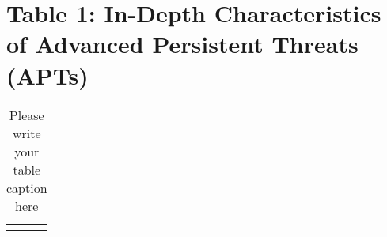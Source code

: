 \section{Table 1: In-Depth Characteristics of Advanced Persistent Threats (APTs)}
%
\begin{table}[!t]
\caption{Please write your table caption here}
\label{tab:1}       %
%
%
\begin{tabular}{p{2.4cm}p{2.4cm}p{4.9cm}}
\hline\noalign{\smallskip}
\noalign{\smallskip}\svhline\noalign{\smallskip}

\end{tabular}
\end{table}
